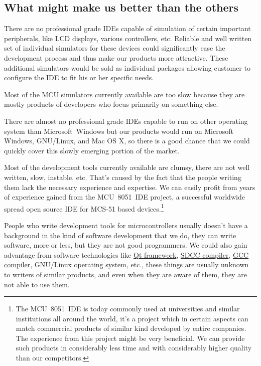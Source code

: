 \documentclass[a4paper,twoside,15pt]{book}
\begin{document}
        \subsection{What might make us better than the others}
            \begin{dinglist}{73}
                \item There are no professional grade IDEs capable of simulation of certain important peripherals, like LCD displays, various controllers, etc. Reliable and well written set of individual simulators for these devices could significantly ease the development process and thus make our products more attractive. These additional simulators would be sold as individual packages allowing customer to configure the IDE to fit his or her specific needs.
                \item Most of the MCU simulators currently available are too slow because they are mostly products of developers who focus primarily on something else.
                \item There are almost no professional grade IDEs capable to run on other operating system than Microsoft\textregistered{}~Windows\textregistered{} but our products would run on Microsoft Windows, GNU/Linux, and Mac OS X, so there is a good chance that we could quickly cover this slowly emerging portion of the market.
                \item Most of the development tools currently available are clumsy, there are not well written, slow, instable, etc. That's caused by the fact that the people writing them lack the necessary experience and expertise. We can easily profit from years of experience gained from the MCU~8051~IDE project, a successful worldwide spread open source IDE for MCS-51 based devices.\footnote{The MCU~8051~IDE is today commonly used at universities and similar institutions all around the world, it's a project which in certain aspects can match commercial products of similar kind developed by entire companies. The experience from this project might be very beneficial. We can provide such products in considerably less time and with considerably higher quality than our competitors.}
                \item People who write development tools for microcontrollers usually doesn't have a background in the kind of software development that we do, they can write software, more or less, but they are not good programmers. We could also gain advantage from software technologies like \href{http://en.wikipedia.org/wiki/Qt_framework}{Qt framework}, \href{http://en.wikipedia.org/wiki/Small_Device_C_Compiler}{SDCC compiler}, \href{http://en.wikipedia.org/wiki/GNU_Compiler_Collection}{GCC compiler}, GNU/Linux operating system, etc., these things are usually unknown to writers of similar products, and even when they are aware of them, they are not able to use them.
            \end{dinglist}
\end{document}
